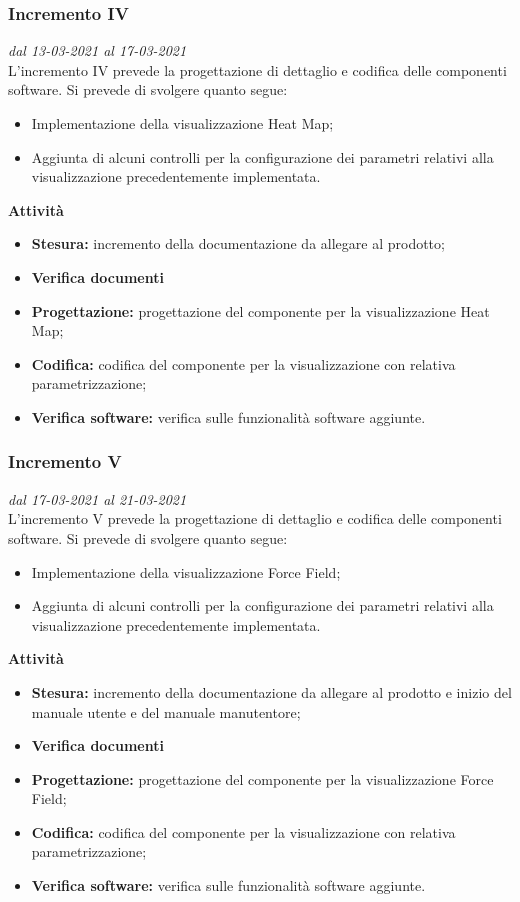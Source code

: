 \subsubsection{Incremento IV}
\textit{dal 13-03-2021 al 17-03-2021}\\
L'incremento IV prevede la progettazione di dettaglio e codifica delle componenti software. Si prevede di svolgere quanto segue:
\begin{itemize}
\item Implementazione della visualizzazione Heat Map;
\item Aggiunta di alcuni controlli per la configurazione dei parametri relativi alla visualizzazione precedentemente implementata.
\end{itemize}
\textbf{Attività}
\begin{itemize}
\item \textbf{Stesura:} incremento della documentazione da allegare al prodotto;
\item \textbf{Verifica documenti}
\item \textbf{Progettazione:} progettazione del componente per la visualizzazione Heat Map;
\item \textbf{Codifica:} codifica del componente per la visualizzazione con relativa parametrizzazione;
\item \textbf{Verifica software:} verifica sulle funzionalità software aggiunte.
\end{itemize}

\subsubsection{Incremento V}
\textit{dal 17-03-2021 al 21-03-2021}\\
L'incremento V prevede la progettazione di dettaglio e codifica delle componenti software. Si prevede di svolgere quanto segue:
\begin{itemize}
\item Implementazione della visualizzazione Force Field;
\item Aggiunta di alcuni controlli per la configurazione dei parametri relativi alla visualizzazione precedentemente implementata.
\end{itemize}
\textbf{Attività}
\begin{itemize}
\item \textbf{Stesura:} incremento della documentazione da allegare al prodotto e inizio del manuale utente e del manuale manutentore;
\item \textbf{Verifica documenti}
\item \textbf{Progettazione:} progettazione del componente per la visualizzazione Force Field;
\item \textbf{Codifica:} codifica del componente per la visualizzazione con relativa parametrizzazione;
\item \textbf{Verifica software:} verifica sulle funzionalità software aggiunte.
\end{itemize}

